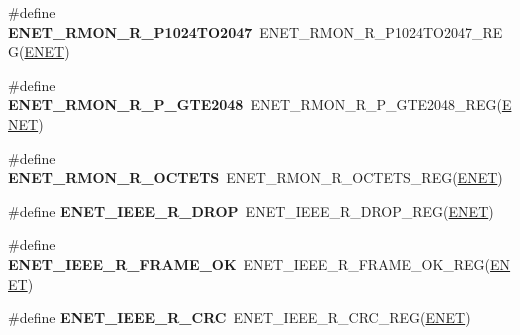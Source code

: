 \begin{DoxyCompactItemize}
\item 
\#define {\bfseries E\+N\+E\+T\+\_\+\+R\+M\+O\+N\+\_\+\+R\+\_\+\+P1024\+T\+O2047}~E\+N\+E\+T\+\_\+\+R\+M\+O\+N\+\_\+\+R\+\_\+\+P1024\+T\+O2047\+\_\+\+R\+EG(\hyperlink{group__ENET__Peripheral__Access__Layer_ga4745105f505f3ab949d6a57fbe2a0ed5}{E\+N\+ET})\hypertarget{group__ENET__Register__Accessor__Macros_ga99cd39d027b2229cca4fccb4a632c18e}{}\label{group__ENET__Register__Accessor__Macros_ga99cd39d027b2229cca4fccb4a632c18e}

\item 
\#define {\bfseries E\+N\+E\+T\+\_\+\+R\+M\+O\+N\+\_\+\+R\+\_\+\+P\+\_\+\+G\+T\+E2048}~E\+N\+E\+T\+\_\+\+R\+M\+O\+N\+\_\+\+R\+\_\+\+P\+\_\+\+G\+T\+E2048\+\_\+\+R\+EG(\hyperlink{group__ENET__Peripheral__Access__Layer_ga4745105f505f3ab949d6a57fbe2a0ed5}{E\+N\+ET})\hypertarget{group__ENET__Register__Accessor__Macros_ga56a77b358a36b49a431e33c3c08b95a8}{}\label{group__ENET__Register__Accessor__Macros_ga56a77b358a36b49a431e33c3c08b95a8}

\item 
\#define {\bfseries E\+N\+E\+T\+\_\+\+R\+M\+O\+N\+\_\+\+R\+\_\+\+O\+C\+T\+E\+TS}~E\+N\+E\+T\+\_\+\+R\+M\+O\+N\+\_\+\+R\+\_\+\+O\+C\+T\+E\+T\+S\+\_\+\+R\+EG(\hyperlink{group__ENET__Peripheral__Access__Layer_ga4745105f505f3ab949d6a57fbe2a0ed5}{E\+N\+ET})\hypertarget{group__ENET__Register__Accessor__Macros_gafcac9c606ebecf297e008fa0a7079327}{}\label{group__ENET__Register__Accessor__Macros_gafcac9c606ebecf297e008fa0a7079327}

\item 
\#define {\bfseries E\+N\+E\+T\+\_\+\+I\+E\+E\+E\+\_\+\+R\+\_\+\+D\+R\+OP}~E\+N\+E\+T\+\_\+\+I\+E\+E\+E\+\_\+\+R\+\_\+\+D\+R\+O\+P\+\_\+\+R\+EG(\hyperlink{group__ENET__Peripheral__Access__Layer_ga4745105f505f3ab949d6a57fbe2a0ed5}{E\+N\+ET})\hypertarget{group__ENET__Register__Accessor__Macros_gaccf89cd15d247486412191b1af3f77c3}{}\label{group__ENET__Register__Accessor__Macros_gaccf89cd15d247486412191b1af3f77c3}

\item 
\#define {\bfseries E\+N\+E\+T\+\_\+\+I\+E\+E\+E\+\_\+\+R\+\_\+\+F\+R\+A\+M\+E\+\_\+\+OK}~E\+N\+E\+T\+\_\+\+I\+E\+E\+E\+\_\+\+R\+\_\+\+F\+R\+A\+M\+E\+\_\+\+O\+K\+\_\+\+R\+EG(\hyperlink{group__ENET__Peripheral__Access__Layer_ga4745105f505f3ab949d6a57fbe2a0ed5}{E\+N\+ET})\hypertarget{group__ENET__Register__Accessor__Macros_ga8dec0614e17f4be2b36f2ed6c68695ef}{}\label{group__ENET__Register__Accessor__Macros_ga8dec0614e17f4be2b36f2ed6c68695ef}

\item 
\#define {\bfseries E\+N\+E\+T\+\_\+\+I\+E\+E\+E\+\_\+\+R\+\_\+\+C\+RC}~E\+N\+E\+T\+\_\+\+I\+E\+E\+E\+\_\+\+R\+\_\+\+C\+R\+C\+\_\+\+R\+EG(\hyperlink{group__ENET__Peripheral__Access__Layer_ga4745105f505f3ab949d6a57fbe2a0ed5}{E\+N\+ET})\hypertarget{group__ENET__Register__Accessor__Macros_ga517e6963ed94b067d5820f77694f9fb5}{}\label{group__ENET__Register__Accessor__Macros_ga517e6963ed94b067d5820f77694f9fb5}


\end{DoxyCompactItemize}
